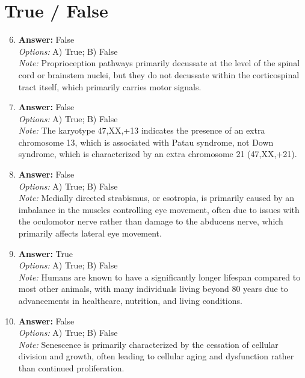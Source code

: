 \documentclass[12pt]{article}
\begin{document}
\section*{True / False}
\begin{enumerate}[label=\arabic*.]
\setcounter{enumi}{5}
\item \textbf{Answer:} False
\\ \textit{Options:} A) True; B) False
\\ \textit{Note:} Proprioception pathways primarily decussate at the level of the spinal cord or brainstem nuclei, but they do not decussate within the corticospinal tract itself, which primarily carries motor signals.
\item \textbf{Answer:} False
\\ \textit{Options:} A) True; B) False
\\ \textit{Note:} The karyotype 47,XX,+13 indicates the presence of an extra chromosome 13, which is associated with Patau syndrome, not Down syndrome, which is characterized by an extra chromosome 21 (47,XX,+21).
\item \textbf{Answer:} False
\\ \textit{Options:} A) True; B) False
\\ \textit{Note:} Medially directed strabismus, or esotropia, is primarily caused by an imbalance in the muscles controlling eye movement, often due to issues with the oculomotor nerve rather than damage to the abducens nerve, which primarily affects lateral eye movement.
\item \textbf{Answer:} True
\\ \textit{Options:} A) True; B) False
\\ \textit{Note:} Humans are known to have a significantly longer lifespan compared to most other animals, with many individuals living beyond 80 years due to advancements in healthcare, nutrition, and living conditions.
\item \textbf{Answer:} False
\\ \textit{Options:} A) True; B) False
\\ \textit{Note:} Senescence is primarily characterized by the cessation of cellular division and growth, often leading to cellular aging and dysfunction rather than continued proliferation.
\end{enumerate}
\end{document}
